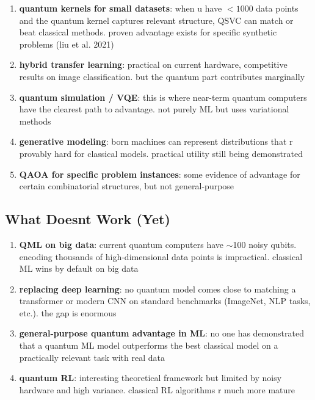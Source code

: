 \documentclass[11pt,a4paper]{article}
\theoremstyle{definition}
\theoremstyle{remark}
\begin{document}
\begin{enumerate}[label=\arabic*.]
    \item \textbf{quantum kernels for small datasets}: when u have $< 1000$ data points and the quantum kernel captures relevant structure, QSVC can match or beat classical methods. proven advantage exists for specific synthetic problems (liu et al. 2021)

    \item \textbf{hybrid transfer learning}: practical on current hardware, competitive results on image classification. but the quantum part contributes marginally

    \item \textbf{quantum simulation / VQE}: this is where near-term quantum computers have the clearest path to advantage. not purely ML but uses variational methods

    \item \textbf{generative modeling}: born machines can represent distributions that r provably hard for classical models. practical utility still being demonstrated

    \item \textbf{QAOA for specific problem instances}: some evidence of advantage for certain combinatorial structures, but not general-purpose
\end{enumerate}

\subsection{What Doesnt Work (Yet)}

\begin{enumerate}[label=\arabic*.]
    \item \textbf{QML on big data}: current quantum computers have $\sim$100 noisy qubits. encoding thousands of high-dimensional data points is impractical. classical ML wins by default on big data

    \item \textbf{replacing deep learning}: no quantum model comes close to matching a transformer or modern CNN on standard benchmarks (ImageNet, NLP tasks, etc.). the gap is enormous

    \item \textbf{general-purpose quantum advantage in ML}: no one has demonstrated that a quantum ML model outperforms the best classical model on a practically relevant task with real data

    \item \textbf{quantum RL}: interesting theoretical framework but limited by noisy hardware and high variance. classical RL algorithms r much more mature
\end{enumerate}
\end{document}
